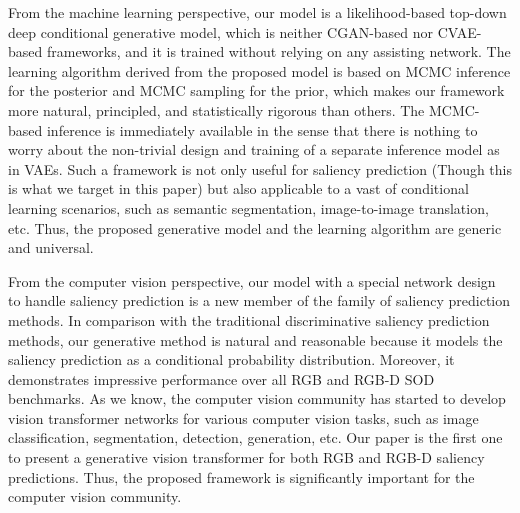 \documentclass{article}
\begin{document}
From the machine learning perspective, our model is a likelihood-based top-down deep conditional generative model, which is neither CGAN-based nor CVAE-based frameworks, and it is trained without relying on any assisting network. The learning algorithm derived from the proposed model is based on MCMC inference for the posterior and MCMC sampling for the prior, which makes our framework more natural, principled, and statistically rigorous than others. The MCMC-based inference is immediately available in the sense that there is nothing to worry about the non-trivial design and training of a separate inference model as in VAEs. Such a framework is not only useful for saliency prediction (Though this is what we target in this paper) but also applicable to a vast of conditional learning scenarios, such as semantic segmentation, image-to-image translation, etc. Thus, the proposed generative model and the learning algorithm are generic and universal.

From the computer vision perspective, our model with a special network design to handle saliency prediction is a new member of the family of saliency prediction methods. In comparison with the traditional discriminative saliency prediction methods, our generative method is  natural and reasonable because it models the saliency prediction as a conditional probability distribution. Moreover, it demonstrates impressive performance over all RGB and RGB-D SOD benchmarks. As we know, the computer vision community has started to develop vision transformer networks for various computer vision tasks, such as image classification, segmentation, detection, generation, etc. Our paper is the first one to present a generative vision transformer for both RGB and RGB-D saliency predictions. Thus, the proposed framework is significantly important for the computer vision community.









\end{document}

